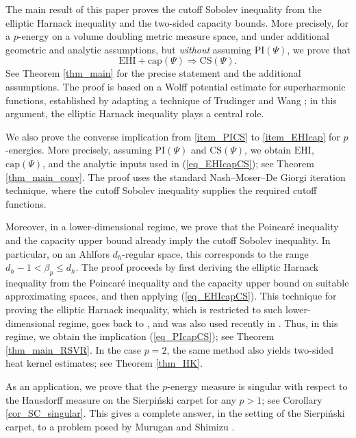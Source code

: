 \documentclass[11pt,a4paper]{article}
\numberwithin{equation}{section}
\theoremstyle{plain}
\theoremstyle{definition}
\begin{document}
The main result of this paper proves the cutoff Sobolev inequality from the elliptic Harnack inequality and the two-sided capacity bounds. More precisely, for a $p$-energy on a volume doubling metric measure space, and under additional geometric and analytic assumptions, but \emph{without} assuming $\text{PI}(\Psi)$, we prove that
\begin{equation}\label{eq_EHIcapCS}
\text{EHI}+\text{cap}(\Psi)\Rightarrow \text{CS}(\Psi).
\end{equation}
See Theorem \ref{thm_main} for the precise statement and the additional assumptions. The proof is based on a Wolff potential estimate for superharmonic functions, established by adapting a technique of Trudinger and Wang \cite{TW02AJM}; in this argument, the elliptic Harnack inequality plays a central role.

We also prove the converse implication from \ref{item_PICS} to \ref{item_EHIcap} for $p$-energies. More precisely, assuming $\text{PI}(\Psi)$ and $\text{CS}(\Psi)$, we obtain $\text{EHI}$, $\text{cap}(\Psi)$, and the analytic inputs used in (\ref{eq_EHIcapCS}); see Theorem \ref{thm_main_conv}. The proof uses the standard Nash--Moser--De Giorgi iteration technique, where the cutoff Sobolev inequality supplies the required cutoff functions.

Moreover, in a lower-dimensional regime, we prove that the Poincar\'e inequality and the capacity upper bound already imply the cutoff Sobolev inequality. In particular, on an Ahlfors $d_h$-regular space, this corresponds to the range $d_h-1<\beta_p\le d_h$. The proof proceeds by first deriving the elliptic Harnack inequality from the Poincar\'e inequality and the capacity upper bound on suitable approximating spaces, and then applying (\ref{eq_EHIcapCS}). This technique for proving the elliptic Harnack inequality, which is restricted to such lower-dimensional regime, goes back to \cite{Hol03}, and was also used recently in \cite{Mur23a,MS25}. Thus, in this regime, we obtain the implication (\ref{eq_PIcapCS}); see Theorem \ref{thm_main_RSVR}. In the case $p=2$, the same method also yields two-sided heat kernel estimates; see Theorem \ref{thm_HK}.

As an application, we prove that the $p$-energy measure is singular with respect to the Hausdorff measure on the Sierpi\'nski carpet for any $p>1$; see Corollary \ref{cor_SC_singular}. This gives a complete answer, in the setting of the Sierpi\'nski carpet, to a problem posed by Murugan and Shimizu \cite[Problem 10.5]{MS25}.
\end{document}
